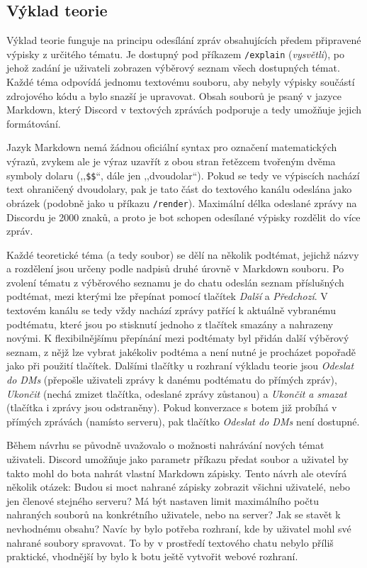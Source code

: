 \documentclass[FM]{tulthesis}
\begin{document}
	\subsection{Výklad teorie}
	
	Výklad teorie funguje na principu odesílání zpráv obsahujících předem připravené výpisky z určitého tématu. Je dostupný pod příkazem \verb*|/explain| (\textit{vysvětli}), po jehož zadání je uživateli zobrazen výběrový seznam všech dostupných témat. Každé téma odpovídá jednomu textovému souboru, aby nebyly výpisky součástí zdrojového kódu a bylo snazší je upravovat. Obsah souborů je psaný v jazyce Markdown, který Discord v textových zprávách podporuje a tedy umožňuje jejich formátování.
	
	Jazyk Markdown nemá žádnou oficiální syntax pro označení matematických výrazů, zvykem ale je výraz uzavřít z obou stran řetězcem tvořeným dvěma symboly dolaru (,,\verb*|$$|``, dále jen ,,dvoudolar``). Pokud se tedy ve výpiscích nachází text ohraničený dvoudolary, pak je tato část do textového kanálu odeslána jako obrázek (podobně jako u příkazu \verb*|/render|). Maximální délka odeslané zprávy na Discordu je 2000 znaků, a proto je bot schopen odesílané výpisky rozdělit do více zpráv. %
	
	Každé teoretické téma (a tedy soubor) se dělí na několik podtémat, jejichž názvy a rozdělení jsou určeny podle nadpisů druhé úrovně v Markdown souboru. Po zvolení tématu z výběrového seznamu je do chatu odeslán seznam příslušných podtémat, mezi kterými lze přepínat pomocí tlačítek \textit{Další} a \textit{Předchozí}. V textovém kanálu se tedy vždy nachází zprávy patřící k aktuálně vybranému podtématu, které jsou po stisknutí jednoho z tlačítek smazány a nahrazeny novými. K flexibilnějšímu přepínání mezi podtématy byl přidán další výběrový seznam, z nějž lze vybrat jakékoliv podtéma a není nutné je procházet popořadě jako při použití tlačítek. Dalšími tlačítky u rozhraní výkladu teorie jsou \textit{Odeslat do DMs} (přepošle uživateli zprávy k danému podtématu do přímých zpráv), \textit{Ukončit} (nechá zmizet tlačítka, odeslané zprávy zůstanou) a \textit{Ukončit a smazat} (tlačítka i zprávy jsou odstraněny). Pokud konverzace s botem již probíhá v přímých zprávách (namísto serveru), pak tlačítko \textit{Odeslat do DMs} není dostupné.
	
	Během návrhu se původně uvažovalo o možnosti nahrávání nových témat uživateli. Discord umožňuje jako parametr příkazu předat soubor a uživatel by takto mohl do bota nahrát vlastní Markdown zápisky. Tento návrh ale otevírá několik otázek: Budou si moct nahrané zápisky zobrazit všichni uživatelé, nebo jen členové stejného serveru? Má být nastaven limit maximálního počtu nahraných souborů na konkrétního uživatele, nebo na server? Jak se stavět k nevhodnému obsahu? Navíc by bylo potřeba rozhraní, kde by uživatel mohl své nahrané soubory spravovat. To by v prostředí textového chatu nebylo příliš praktické, vhodnější by bylo k botu ještě vytvořit webové rozhraní.
	
\end{document}
